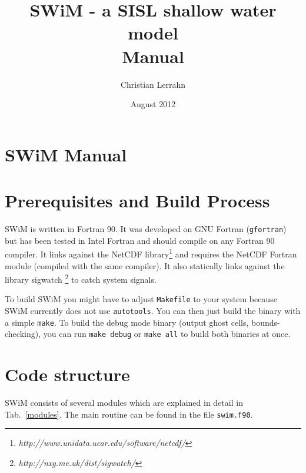 \documentclass[11pt,a4paper,openright,twoside]{book}
\newcommand{\thecodenospace}{SWiM}
\newcommand{\thecode}{\thecodenospace{ }}
\begin{document}
\title{SWiM - a SISL shallow water model\\Manual}
\author{Christian Lerrahn}
\date{August 2012}
\maketitle

\tableofcontents

\section{\thecode Manual}

\section{Prerequisites and Build Process}
\thecode is written in Fortran 90. It was developed on GNU Fortran (\texttt{gfortran}) but has been tested in Intel Fortran
and should compile on any Fortran 90 compiler. It links against the NetCDF library\footnote{\textit{http://www.unidata.ucar.edu/software/netcdf/}} and requires the NetCDF Fortran module (compiled with the same compiler).
It also statically links against the library sigwatch \footnote{\textit{http://nxg.me.uk/dist/sigwatch/}} to catch system signals.

To build \thecode you might have to adjust \texttt{Makefile} to your system because \thecode currently does not use
\texttt{autotools}. You can then just build the binary with a simple \texttt{make}. To build the debug mode binary
(output ghost cells, bounds-checking), you can run \texttt{make debug} or \texttt{make all} to build both binaries at once.

\section{Code structure}
\thecode consists of several modules which are explained in detail in Tab.~\ref{modules}. The main routine can be found in
the file \texttt{swim.f90}.
\end{document}
